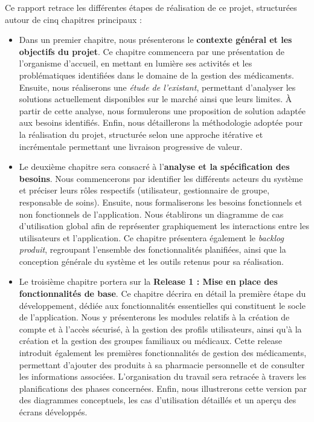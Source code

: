 Ce rapport retrace les différentes étapes de réalisation de ce projet, structurées autour de cinq chapitres principaux :

\begin{itemize}
  \item Dans un premier chapitre, nous présenterons le \textbf{contexte général et les objectifs du projet}.
  Ce chapitre commencera par une présentation de l'organisme d'accueil, en mettant en lumière ses activités et les problématiques identifiées dans le domaine de la gestion des médicaments.
  Ensuite, nous réaliserons une \textit{étude de l'existant}, permettant d'analyser les solutions actuellement disponibles sur le marché ainsi que leurs limites.
  À partir de cette analyse, nous formulerons une proposition de solution adaptée aux besoins identifiés.
  Enfin, nous détaillerons la méthodologie adoptée pour la réalisation du projet, structurée selon une approche itérative et incrémentale permettant une livraison progressive de valeur.

  \item Le deuxième chapitre sera consacré à l'\textbf{analyse et la spécification des besoins}.
  Nous commencerons par identifier les différents acteurs du système et préciser leurs rôles respectifs (utilisateur, gestionnaire de groupe, responsable de soins).
  Ensuite, nous formaliserons les besoins fonctionnels et non fonctionnels de l'application.
  Nous établirons un diagramme de cas d'utilisation global afin de représenter graphiquement les interactions entre les utilisateurs et l'application.
  Ce chapitre présentera également le \textit{backlog produit}, regroupant l'ensemble des fonctionnalités planifiées, ainsi que la conception générale du système et les outils retenus pour sa réalisation.

  \item Le troisième chapitre portera sur la \textbf{Release 1 : Mise en place des fonctionnalités de base}.
  Ce chapitre décrira en détail la première étape du développement, dédiée aux fonctionnalités essentielles qui constituent le socle de l'application.
  Nous y présenterons les modules relatifs à la création de compte et à l'accès sécurisé, à la gestion des profils utilisateurs, ainsi qu'à la création et la gestion des groupes familiaux ou médicaux.
  Cette release introduit également les premières fonctionnalités de gestion des médicaments, permettant d'ajouter des produits à sa pharmacie personnelle et de consulter les informations associées.
  L'organisation du travail sera retracée à travers les planifications des phases concernées.
  Enfin, nous illustrerons cette version par des diagrammes conceptuels, les cas d'utilisation détaillés et un aperçu des écrans développés.


\end{itemize}

